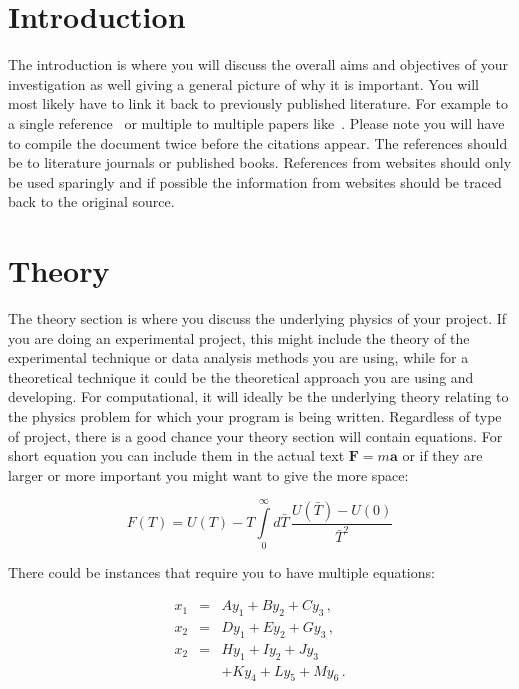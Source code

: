\documentclass[a4paper,12pt, notitlepage]{article}
\begin{document}
\section{Introduction}
The introduction is where you will discuss the overall aims and objectives of your investigation as well giving a general picture of why it is important. You will most likely have to link it back to previously published literature. For example to a single reference~\cite{Paper_1} or multiple to multiple papers like~\cite{Paper_1, Paper_2, Paper_3}. Please note you will have to compile the document twice before the citations appear. The references should be to literature journals or published books. References from websites should only be used sparingly and if possible the information from websites should be traced back to the original source.


\section{Theory}
The theory section is where you discuss the underlying physics of your project. If you are doing an experimental project, this might include the theory of the experimental technique or data analysis methods you are using, while for a theoretical technique it could be the theoretical approach you are using and developing. For computational, it will ideally be the underlying theory relating to the physics problem for which your program is being written. Regardless of type of project, there is a good chance your theory section will contain equations. For short equation you can include them in the actual text $\mathbf{F} = m\mathbf{a}$ or if they are larger or more important you might want to give the more space:

\begin{equation}
F(T) = U(T) - T \int\limits_0^\infty d \bar{T} \, \frac{U(\bar{T}) - U(0)}{\bar{T}^2}
\label{equation1}
\end{equation}

There could be instances that require you to have multiple equations:

\begin{eqnarray}
x_1 &=& A y_1 + B y_2 + C y_3    \,, \\
x_2 &=& D y_1 + E y_2 + G y_3    \,, \\ 
x_2 &=& H y_1 + I y_2 + J y_3    \nonumber\\
    &~& + K y_4 + L y_5 + M y_6  \,. 
\label{eq: eq_2}
\end{eqnarray}
\end{document}
